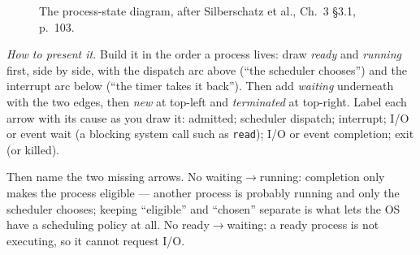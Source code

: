 \documentclass[11pt]{article}
\begin{document}
\begin{figure}[h]
\centering
{}
\caption{The process-state diagram, after Silberschatz et al., Ch.~3 \S3.1, p.~103.}
\end{figure}

\emph{How to present it.} Build it in the order a process lives: draw \emph{ready} and \emph{running} first, side by side, with the dispatch arc above (``the scheduler chooses'') and the interrupt arc below (``the timer takes it back''). Then add \emph{waiting} underneath with the two edges, then \emph{new} at top-left and \emph{terminated} at top-right. Label each arrow with its cause as you draw it: admitted; scheduler dispatch; interrupt; I/O or event wait (a blocking system call such as \texttt{read}); I/O or event completion; exit (or killed).

Then name the two missing arrows. No waiting$\to$running: completion only makes the process eligible --- another process is probably running and only the scheduler chooses; keeping ``eligible'' and ``chosen'' separate is what lets the OS have a scheduling policy at all. No ready$\to$waiting: a ready process is not executing, so it cannot request I/O.
\end{document}
